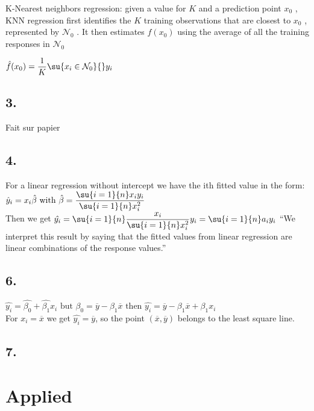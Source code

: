 \documentclass[a4paper, 10pt]{scrartcl}\usepackage[]{graphicx}\usepackage[]{color}
\begin{document}
K-Nearest neighbors regression: given a value for $K$ and a prediction 
point $x_{0}$ , KNN regression first identifies the $K$ training 
observations that are closest to
$x_{0}$ , represented by $\mathcal{N}_{0}$ . It then estimates $f(x_{0})$ using the
average of all the training responses in $\mathcal{N}_{0}$
\begin{center}
	$\hat{f}(x_{0})=\dfrac{1}{K}\su{ {x_{i}\in\mathcal{N}_{0}}}{}y_{i}$
\end{center}
\subsection{3.}
Fait sur papier
\subsection{4.}
For a linear regression without intercept we have the ith fitted value
in the form: $\hat{y}_{i}=x_{i}\hat{\beta}\text{ with }\hat{\beta}=
\dfrac{\su{ {i=1}}{n}x_{i}y_{i}}{\su{ {i=1}}{n}x_{i}^{2}}$\\Then we get
$\hat{y_{i}}=\su{ {i=1}}{n}\dfrac{x_{i}}{\su{ {i=1}}{n}x_{i}^{2}}y_{i}=
\su{ {i=1}}{n}a_{i}y_{i}$
``We interpret this result by saying that the fitted values from
linear regression are linear combinations of the response values.''
\subsection{6.}
$\hat{y_{i}}=\hat{\beta_{0}}+\hat{\beta_{1}}x_{i}\text{ but }\beta_{0}=
\overline{y}-\beta_{1}\overline{x}\text{ then }\hat{y_{i}}=\overline{y}
-\beta_{1}\overline{x}+\beta_{1}x_{i}$\\ For $x_{i}=\overline{x}$ we
get $\hat{y_{i}}=\overline{y}$, so the point $(\overline{x},\overline{y})$ belongs to the least square line.
\subsection{7.}

\section{Applied}
\end{document}
